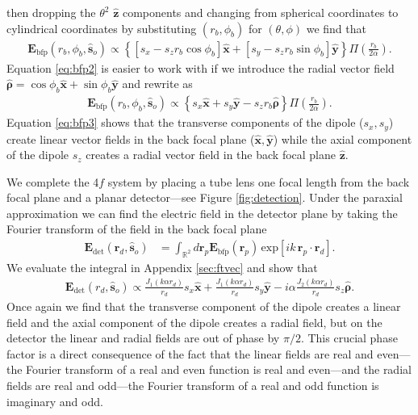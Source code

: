 \documentclass[]{osa-article}
\providecommand{\mb}[1]{\mathbf{#1}}
\providecommand{\so}{\mathbf{\hat{s}}_o}
\providecommand{\rp}{\mathbf{r}_p}
\providecommand{\rd}{\mathbf{r}_d}
\providecommand{\mh}[1]{\mathbf{\hat{#1}}}
\providecommand{\mbb}[1]{\mathbb{#1}}
\providecommand{\bs}[1]{\boldsymbol{#1}}
\begin{document}
then dropping the $\theta^2$ $\mh{z}$ components and changing from spherical
coordinates to cylindrical coordinates by substituting $(r_b, \phi_b)$ for
$(\theta, \phi)$ we find that
\begin{align}
  \mb{E}_{\text{bfp}}(r_b, \phi_b, \so{}) \propto \left\{\left[s_x - s_zr_b\cos\phi_b\right]\mh{x} + \left[s_y - s_z r_b\sin\phi_b\right]\mh{y}\right\}\Pi\left(\frac{r_b}{2\alpha}\right). \label{eq:bfp2}
\end{align}
Equation \ref{eq:bfp2} is easier to work with if we introduce the radial vector
field $\mh{\bs{\rho}} = \cos\phi_b\mh{x} + \sin\phi_b\mh{y}$ and rewrite as
\begin{align}
  \mb{E}_{\text{bfp}}(r_b, \phi_b, \so{}) \propto \left\{s_x\mh{x} + s_y\mh{y} - s_z r_b \mh{\bs{\rho}}\right\}\Pi\left(\frac{r_b}{2\alpha}\right). \label{eq:bfp3}
\end{align}
Equation \ref{eq:bfp3} shows that the transverse components of the dipole
($s_x, s_y$) create linear vector fields in the back focal plane
($\mh{x}, \mh{y}$) while the axial component of the dipole $s_z$ creates a radial
vector field in the back focal plane $\mh{z}$. 

We complete the 4$f$ system by placing a tube lens one focal length from the
back focal plane and a planar detector---see Figure \ref{fig:detection}. Under
the paraxial approximation we can find the electric field in the detector plane
by taking the Fourier transform of the field in the back focal plane
\cite{goodman1996}
\begin{align}
  \mb{E}_{\text{det}}(\rd{}, \so{}) &= \int_{\mbb{R}^2}d\rp{} \mb{E}_{\text{bfp}}(\rp{})\, \text{exp}\left[ik\,\rp{}\cdot\rd{}\right].\label{eq:det1}
\end{align}
We evaluate the integral in Appendix \ref{sec:ftvec} and show that 
\begin{align}
  \mb{E}_{\text{det}}(r_d, \so{}) \propto \frac{J_1(k\alpha r_d)}{r_d}s_x\mh{x} + \frac{J_1(k\alpha r_d)}{r_d}s_y\mh{y} - i\alpha\frac{J_2(k\alpha r_d)}{r_d}s_z\mh{\bs{\rho}}.
\end{align}
Once again we find that the transverse component of the dipole creates a linear
field and the axial component of the dipole creates a radial field, but on the
detector the linear and radial fields are out of phase by $\pi/2$. This crucial
phase factor is a direct consequence of the fact that the linear fields are real
and even---the Fourier transform of a real and even function is real and
even---and the radial fields are real and odd---the Fourier transform of a real
and odd function is imaginary and odd.
\end{document}
